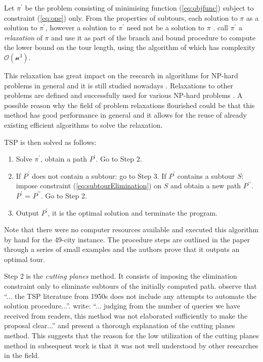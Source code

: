 \documentclass[a4paper,12pt]{article}
\begin{document}
Let $\pi^{\prime}$ be the problem consisting of minimising function (\ref{eq:objfunc}) subject to constraint (\ref{eq:one}) only. From the properties of subtours, each solution to $\pi$ as a solution to $\pi^{\prime}$, however a solution to $\pi^{\prime}$ need not be a solution to $\pi$ \citep{Dantzig54}. \citet{Dantzig54} call $\pi^{\prime}$ a \textit{relaxation} of $\pi$ and use it as part of the branch and bound procedure to compute the lower bound on the tour length, using the algorithm of \citet{Kuhn55a} which has complexity $\mathcal{O(n^{3})}$.

This relaxation has great impact on the research in algorithms for NP-hard problems in general and it is still studied nowadays \citep{Cheung05}. Relaxations to other problems are defined and successfully used for various NP-hard problems \citep{Fisher04,Cruz10,Christofides81}. A possible reason why the field of problem relaxations flourished could be that this method has good performance in general and it allows for the reuse of already existing efficient algorithms to solve the relaxation.

TSP is then solved as follows:
\begin{enumerate}
\item Solve $\pi^{\prime}$, obtain a path $P^{\prime}$. Go to Step 2.
\item %
If $P^{\prime}$ does not contain a subtour: go to Step 3. If $P^{\prime}$ contains a subtour $S$: impose constraint (\ref{eq:subtourElimination}) on $S$ and obtain a new path $P^{\prime\prime}$. $P^{\prime}$ = $P^{\prime\prime}$. Go to Step 2.
\item Output $P^{\prime}$, it is the optimal solution and terminate the program.
\end{enumerate}

Note that there were no computer resources available and \citet{Dantzig54} executed this algorithm by hand for the 49-city instance. The procedure steps are outlined in the paper through a series of small examples and the authors prove that it outputs an optimal tour.

Step 2 is the \textit{cutting planes} method. It consists of imposing the elimination constraint only to eliminate subtours of the initially computed path. \citet{Applegate07} observe that ``... the TSP literature from 1950s does not include any attempts to automate the \citet{Dantzig54} solution procedure...''. \citet{Dantzig59} write: ``... judging from the number of queries we have received from readers, this method was not elaborated sufficiently to make the proposal clear...'' and present a thorough explanation of the cutting planes method. This suggests that the reason for the low utilization of the cutting planes method in subsequent work is that it was not well understood by other researches in the field. 
\end{document}
